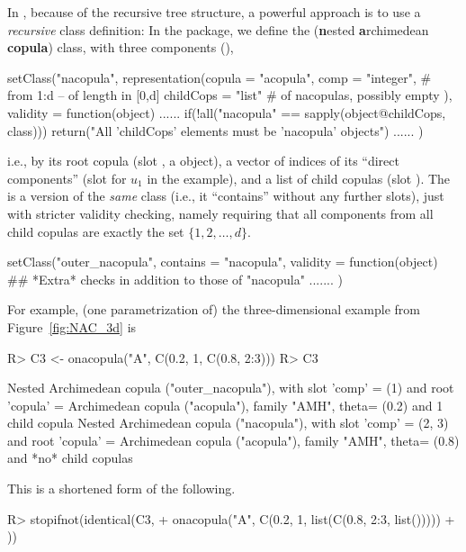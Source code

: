 \documentclass[nojss,article]{jss}
\theoremstyle{mythmstyle}
\newcommand*{\R}{\proglang{R}}%
\begin{document}
In \R, because of the recursive tree structure, a powerful approach is to
use a \emph{recursive} class definition: In the  package, we
define the  (\textbf{n}ested \textbf{a}rchimedean
\textbf{copula}) class, with three components (),
\begin{Schunk}
%% manual cut & paste from ../../R/AllClass.R :
\begin{Sinput}
setClass("nacopula",
	 representation(copula    = "acopula",
                        comp      = "integer",  # from 1:d -- of length in [0,d]
                        childCops = "list"      # of nacopulas, possibly empty
                       ),
         validity = function(object) {
            ......
             if(!all("nacopula" == sapply(object@childCops, class)))
                 return("All 'childCops' elements must be 'nacopula' objects")
            ......
         })
\end{Sinput}
\end{Schunk}
i.e., by its root copula (slot , a  object),
a vector of indices of its ``direct components'' (slot 
for $u_1$ in the example), and a list of child copulas (slot ).
The  is a version of the \emph{same} class (i.e., it
``contains''  without any further slots), just with
stricter validity checking, namely requiring that all components from all
child copulas are exactly the set $\{1,2,\dots,d\}$.
\begin{Schunk}
\begin{Sinput}
setClass("outer_nacopula", contains = "nacopula",
         validity = function(object) {
             ## *Extra* checks in addition to those of "nacopula"
             .......
        })
\end{Sinput}
\end{Schunk}
For example, (one parametrization of) the three-dimensional example from
Figure~\ref{fig:NAC_3d} is
\begin{Schunk}
\begin{Sinput}
R> C3 <- onacopula("A", C(0.2, 1, C(0.8, 2:3)))
R> C3
\end{Sinput}
\begin{Soutput}
Nested Archimedean copula ("outer_nacopula"), with slot 
'comp'   = (1)  and root
'copula' = Archimedean copula ("acopula"), family "AMH", theta= (0.2)
and 1 child copula
   Nested Archimedean copula ("nacopula"), with slot 
   'comp'   = (2, 3)  and root
   'copula' = Archimedean copula ("acopula"), family "AMH", theta= (0.8)
   and *no* child copulas
\end{Soutput}
\end{Schunk}
This is a shortened form of the following.
\begin{Schunk}
\begin{Sinput}
R> stopifnot(identical(C3,
+        onacopula("A", C(0.2, 1, list(C(0.8, 2:3, list()))))
+  ))
\end{Sinput}
\end{Schunk}
\end{document}
